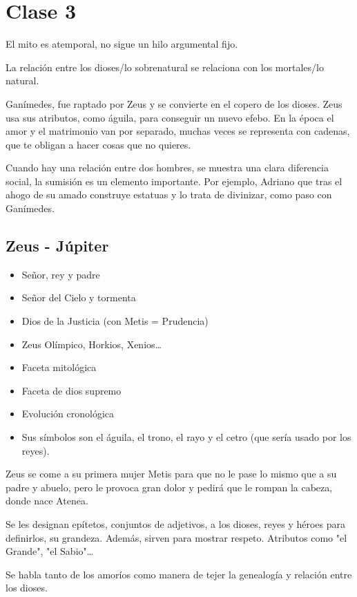\chapter{Clase 3}\label{ch:clase3}
El mito es atemporal, no sigue un hilo argumental fijo.

La relación entre los dioses/lo sobrenatural se relaciona con los mortales/lo natural.

Ganímedes, fue raptado por Zeus y se convierte en el copero de los dioses. Zeus usa sus atributos, como águila, para conseguir un nuevo efebo. En la época el amor y el matrimonio van por separado, muchas veces se representa con cadenas, que te obligan a hacer cosas que no quieres.

Cuando hay una relación entre dos hombres, se muestra una clara diferencia social, la sumisión es un elemento importante. Por ejemplo, Adriano que tras el ahogo de su amado construye estatuas y lo trata de divinizar, como paso con Ganímedes.

\section{Zeus - Júpiter}
\begin{itemize}
    \item Señor, rey y padre
    \item Señor del Cielo y tormenta
    \item Dios de la Justicia (con Metis = Prudencia)
    \item Zeus Olímpico, Horkios, Xenios\dots
    \item Faceta mitológica
    \item Faceta de dios supremo
    \item Evolución cronológica
    \item Sus símbolos son el águila, el trono, el rayo y el cetro (que sería usado por los reyes).
\end{itemize}

Zeus se come a su primera mujer Metis para que no le pase lo mismo que a su padre y abuelo, pero le provoca gran dolor y pedirá que le rompan la cabeza, donde nace Atenea.

Se les designan epítetos, conjuntos de adjetivos, a los dioses, reyes y héroes para definirlos, su grandeza. Además, sirven para mostrar respeto. Atributos como "el Grande", "el Sabio"\dots

Se habla tanto de los amoríos como manera de tejer la genealogía y relación entre los dioses.

